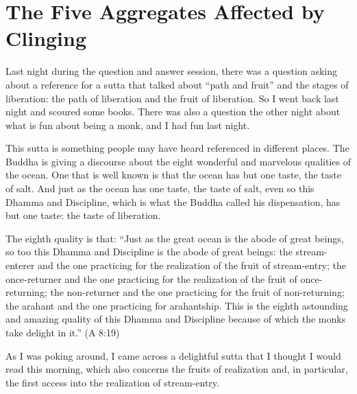 \chapter{The Five Aggregates Affected by
Clinging}

Last night during the question and answer session, there was a question
asking about a reference for a sutta that talked about “path and fruit”
and the stages of liberation: the path of liberation and the fruit of
liberation. So I went back last night and scoured some books. There was
also a question the other night about what is fun about being a monk,
and I had fun last night.

This sutta is something people may have heard referenced in different
places. The Buddha is giving a discourse about the eight wonderful and
marvelous qualities of the ocean. One that is well known is that the
ocean has but one taste, the taste of salt. And just as the ocean has
one taste, the taste of salt, even so this Dhamma and Discipline, which
is what the Buddha called his dispensation, has but one taste: the taste
of liberation.

The eighth quality is that: “Just as the great ocean is the abode of
great beings, so too this Dhamma and Discipline is the abode of great
beings: the stream-enterer and the one practicing for the realization of
the fruit of stream-entry; the once-returner and the one practicing for
the realization of the fruit of once-returning; the non-returner and the
one practicing for the fruit of non-returning; the arahant and the one
practicing for arahantship. This is the eighth astounding and amazing
quality of this Dhamma and Discipline because of which the monks take
delight in it.” (A 8:19)

As I was poking around, I came across a delightful sutta that I thought
I would read this morning, which also concerns the fruits of realization
and, in particular, the first access into the realization of
stream-entry.

